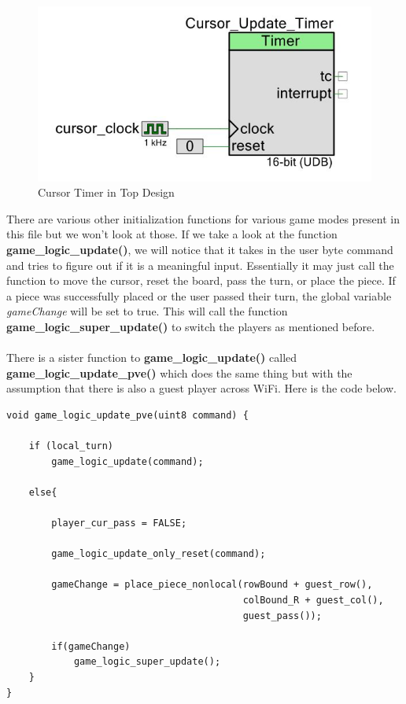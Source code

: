 \documentclass[a4paper, 12pt]{article}
\begin{document}
    \begin{figure}[H]
        \centering
        \includegraphics[scale=0.6]{pics/game_logic}
        \caption{Cursor Timer in Top Design}
        \label{fig:TopDesign}
    \end{figure}

    There are various other initialization functions for various game modes
    present in this file but we won't look at those. If we take a look at
    the function \textbf{game\_logic\_update()}, we will notice that it takes
    in the user byte command and tries to figure out if it is a meaningful
    input. Essentially it may just call the function to move the cursor, reset
    the board, pass the turn, or place the piece. If a piece was successfully
    placed or the user passed their turn, the global variable \textit{gameChange}
    will be set to true. This will call the function 
    \textbf{game\_logic\_super\_update()} to switch the players as mentioned
    before.
    \\ \\
    There is a sister function to \textbf{game\_logic\_update()} called
    \textbf{game\_logic\_update\_pve()} which does the same thing but with
    the assumption that there is also a guest player across WiFi. Here is the code below.

    \begin{verbatim}
void game_logic_update_pve(uint8 command) {
    
    if (local_turn)
        game_logic_update(command);
    
    else{
        
        player_cur_pass = FALSE; 
        
        game_logic_update_only_reset(command);
        
        gameChange = place_piece_nonlocal(rowBound + guest_row(), 
                                          colBound_R + guest_col(), 
                                          guest_pass());
        
        if(gameChange)
            game_logic_super_update();
    }
}
    \end{verbatim}
\end{document}
